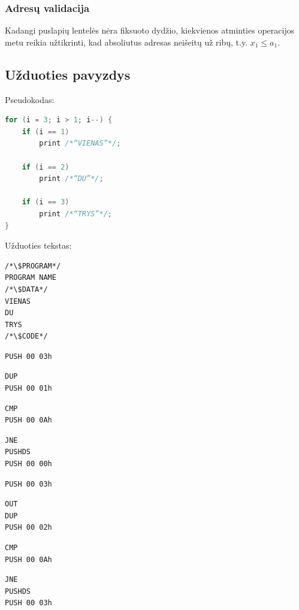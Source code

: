 \documentclass{scrartcl}
\begin{document}
            \subsubsection{Adresų validacija}
                Kadangi puslapių lentelės nėra fiksuoto dydžio, kiekvienos atminties operacijos metu reikia užtikrinti, kad absoliutus adresas neišeitų už ribų, t.y. $x_{1} \leq a_{1}$.
        \subsection{Užduoties pavyzdys}
            Pseudokodas:
            \begin{lstlisting}[language = c]
for (i = 3; i > 1; i--) {
    if (i == 1)
        print /*“VIENAS”*/;

    if (i == 2)
        print /*“DU”*/;

    if (i == 3)
        print /*“TRYS”*/;
}
            \end{lstlisting}
            Užduoties tekstas:
            \lstset{belowskip = 0.0mm, numbers = none}
            \begin{lstlisting}
/*\$PROGRAM*/
PROGRAM NAME
/*\$DATA*/
VIENAS
DU
TRYS
/*\$CODE*/
            \end{lstlisting}
            \lstset{aboveskip = 0.0mm, belowskip = 0.0mm, numbers = left}
            \begin{lstlisting}[firstnumber = 0]
PUSH 00 03h
            \end{lstlisting}
            \begin{lstlisting}[firstnumber = 3]
DUP
PUSH 00 01h
            \end{lstlisting}
            \begin{lstlisting}[firstnumber = 7]
CMP
PUSH 00 0Ah
            \end{lstlisting}
            \begin{lstlisting}[firstnumber = 11]
JNE
PUSHDS
PUSH 00 00h
            \end{lstlisting}
            \begin{lstlisting}[firstnumber = 16]
PUSH 00 03h
            \end{lstlisting}
            \begin{lstlisting}[firstnumber = 19]
OUT
DUP
PUSH 00 02h
            \end{lstlisting}
            \begin{lstlisting}[firstnumber = 24]
CMP
PUSH 00 0Ah
            \end{lstlisting}
            \begin{lstlisting}[firstnumber = 28]
JNE
PUSHDS
PUSH 00 03h
            \end{lstlisting}
\end{document}
